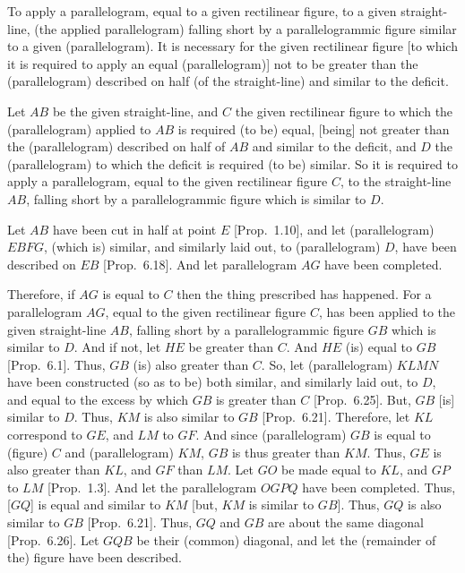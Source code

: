 To apply a parallelogram, equal to a given
rectilinear figure,  to a given
straight-line, (the applied parallelogram) falling short by a parallelogrammic figure similar to a given (parallelogram). It is necessary for the given rectilinear figure [to which it
is required to apply an equal (parallelogram)] not to be  greater than the (parallelogram)
described on half (of the straight-line) and similar to the deficit.

Let $AB$ be the given straight-line, and $C$ the given rectilinear figure to which
the (parallelogram) applied to $AB$ is required (to be) equal, [being] not
greater than the (parallelogram) described on half of $AB$ and
similar to the deficit, and $D$ the (parallelogram) to which the deficit is
required (to be) similar. So it is required to apply a parallelogram, equal to
the given rectilinear figure $C$, 
to the straight-line $AB$, falling short by a parallelogrammic figure which
is similar to $D$.

\epsfysize=1.8in
\centerline{}

Let $AB$ have been cut in half at point $E$  [Prop.~1.10], and let (parallelogram) $EBFG$, (which is)
similar, and similarly laid out, to (parallelogram) $D$, have been described on $EB$ 
[Prop.~6.18]. And let parallelogram
$AG$ have been completed.

Therefore, if $AG$ is equal to $C$ then the thing prescribed has happened. For
a parallelogram  $AG$, equal to the given rectilinear figure $C$, has been
applied to the given straight-line $AB$, falling short by a parallelogrammic
figure $GB$ which is similar to $D$. And if not,  let $HE$ be greater than $C$. 
And $HE$ (is) equal to $GB$ [Prop.~6.1]. 
Thus, $GB$ (is) also greater than $C$.
So, let (parallelogram) $KLMN$ have been constructed (so as to be) both similar, and similarly laid out, to $D$,
and equal to the excess by which $GB$ is greater than $C$ [Prop.~6.25]. But, $GB$ [is] similar to
$D$. Thus, $KM$ is also similar to $GB$
[Prop.~6.21]. Therefore, let $KL$ correspond to
$GE$, and $LM$ to $GF$. And since (parallelogram) $GB$ is equal to
(figure) $C$ and (parallelogram) $KM$, $GB$ is thus greater than $KM$. Thus,
$GE$ is also greater than $KL$, and $GF$ than $LM$. Let $GO$ be made equal to
$KL$, and $GP$ to $LM$  [Prop.~1.3]. And let the parallelogram
$OGPQ$ have been completed. Thus, [$GQ$] is equal and similar to
$KM$ [but, $KM$ is similar to $GB$]. Thus, $GQ$ is also similar to $GB$ [Prop.~6.21]. Thus, $GQ$ and $GB$ are about the
same diagonal [Prop.~6.26]. 
Let $GQB$ be their (common) diagonal, and let the (remainder of the) figure have been described.

